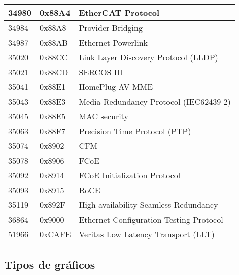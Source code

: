 \begin{table}[H]
\begin{tabular}{|l|l|l}
34980 & 0x88A4 & EtherCAT Protocol \\ \hline
34984 & 0x88A8 & Provider Bridging \\ \hline
34987 & 0x88AB & Ethernet Powerlink \\ \hline
35020 & 0x88CC & Link Layer Discovery Protocol (LLDP) \\ \hline
35021 & 0x88CD & SERCOS III \\ \hline
35041 & 0x88E1 & HomePlug AV MME \\ \hline
35043 & 0x88E3 & Media Redundancy Protocol (IEC62439-2) \\ \hline
35045 & 0x88E5 & MAC security \\ \hline
35063 & 0x88F7 & Precision Time Protocol (PTP)\\ \hline
35074 & 0x8902 & CFM \\ \hline
35078 & 0x8906 & FCoE \\ \hline
35092 & 0x8914 & FCoE Initialization Protocol \\ \hline
35093 & 0x8915 & RoCE \\ \hline
35119 & 0x892F & High-availability Seamless Redundancy \\ \hline
36864 & 0x9000 & Ethernet Configuration Testing Protocol \\ \hline
51966 & 0xCAFE & Veritas Low Latency Transport (LLT) \\ \hline
\end{tabular}
\end{table}

\subsection{Tipos de gráficos}


